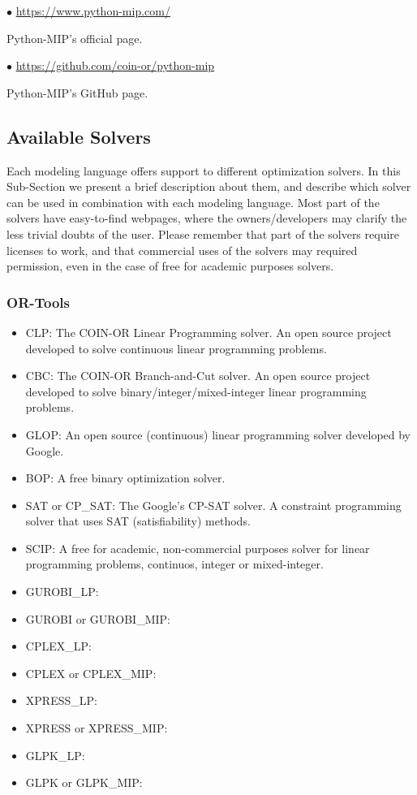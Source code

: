 \documentclass[12pt,hidelinks]{article}
\begin{document}
		$\bullet$ \url{https://www.python-mip.com/}

		Python-MIP's official page.

		$\bullet$ \url{https://github.com/coin-or/python-mip}

		Python-MIP's GitHub page.

	\subsection{Available Solvers}

	Each modeling language offers support to different optimization solvers. In this Sub-Section we present a brief description about them, and describe which solver can be used in combination with each modeling language. Most part of the solvers have easy-to-find webpages, where the owners/developers may clarify the less trivial doubts of the user. Please remember that part of the solvers require licenses to work, and that commercial uses of the solvers may required permission, even in the case of free for academic purposes solvers.

	\subsubsection{OR-Tools}

		\begin{itemize}
			\item CLP: The COIN-OR Linear Programming solver. An open source project developed to solve continuous linear programming problems.
			\item CBC: The COIN-OR Branch-and-Cut solver. An open source project developed to solve binary/integer/mixed-integer linear programming problems.
			\item GLOP: An open source (continuous) linear programming solver developed by Google.
			\item BOP: A free binary optimization solver.
			\item SAT or CP\_SAT: The Google's CP-SAT solver. A constraint programming solver that uses SAT (satisfiability) methods.
			\item SCIP: A free for academic, non-commercial purposes solver for linear programming problems, continuos, integer or mixed-integer.
			\item GUROBI\_LP:
			\item GUROBI or GUROBI\_MIP:
			\item CPLEX\_LP:
			\item CPLEX or CPLEX\_MIP:
			\item XPRESS\_LP:
			\item XPRESS or XPRESS\_MIP:
			\item GLPK\_LP:
			\item GLPK or GLPK\_MIP:
		\end{itemize}
\end{document}
